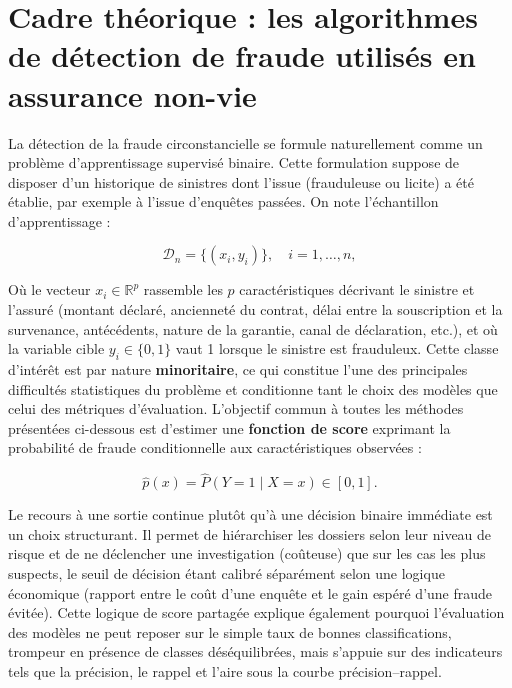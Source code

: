 \chapter{Cadre théorique : les algorithmes de détection de fraude utilisés en assurance non-vie}
\label{chap:theorie}

La détection de la fraude circonstancielle se formule naturellement comme un problème d'apprentissage supervisé binaire. Cette formulation suppose de disposer d'un historique de sinistres dont l'issue (frauduleuse ou licite) a été établie, par exemple à l'issue d'enquêtes passées. On note l'échantillon d'apprentissage :

\begin{equation}
    \mathcal{D}_n = \{ (x_i, y_i) \}, \quad i = 1, \dots, n,
\end{equation}

Où le vecteur $x_i \in \mathbb{R}^p$ rassemble les $p$ caractéristiques décrivant le sinistre et l'assuré (montant déclaré, ancienneté du contrat, délai entre la souscription et la survenance, antécédents, nature de la garantie, canal de déclaration, etc.), et où la variable cible $y_i \in \{0, 1\}$ vaut 1 lorsque le sinistre est frauduleux. Cette classe d'intérêt est par nature \textbf{minoritaire}, ce qui constitue l'une des principales difficultés statistiques du problème et conditionne tant le choix des modèles que celui des métriques d'évaluation. L'objectif commun à toutes les méthodes présentées ci-dessous est d'estimer une \textbf{fonction de score} exprimant la probabilité de fraude conditionnelle aux caractéristiques observées :

\begin{equation}
    \hat{p}(x) = \hat{P}(Y = 1 \mid X = x) \in [0, 1].
\end{equation}

Le recours à une sortie continue plutôt qu'à une décision binaire immédiate est un choix structurant. Il permet de hiérarchiser les dossiers selon leur niveau de risque et de ne déclencher une investigation (coûteuse) que sur les cas les plus suspects, le seuil de décision étant calibré séparément selon une logique économique (rapport entre le coût d'une enquête et le gain espéré d'une fraude évitée). Cette logique de score partagée explique également pourquoi l'évaluation des modèles ne peut reposer sur le simple taux de bonnes classifications, trompeur en présence de classes déséquilibrées, mais s'appuie sur des indicateurs tels que la précision, le rappel et l'aire sous la courbe précision--rappel.

